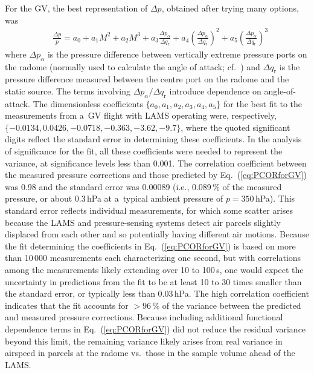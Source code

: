 \documentclass[amtd, online, hvmath]{copernicus}
\begin{document}
For the GV, the best representation of $\Delta p$, obtained after
trying many options, was
\begin{align}
    &\frac{\Delta p}{p}  = a_0+a_1M^2+a_2M^3
    +a_3\frac{\Delta p_{\alpha}}{\Delta
      q_{\mathrm{r}}}+a_4\left(\frac{\Delta p_{\alpha}}{\Delta
        q_{\mathrm{r}}}\right)^2+a_5\left(\frac{\Delta
        p_{\alpha}}{\Delta q_{\mathrm{r}}}\right)^3\label{eq:PCORforGV}
\end{align}
where $\Delta p_{\alpha}$ is the pressure difference between
vertically extreme pressure ports on the radome (normally used to
calculate the angle of attack; cf.~\citealp{BrownFrieheLenschow1983})
and $\Delta q_{\mathrm{r}}$ is the pressure difference measured
between the centre port on the radome and the static source. The terms
involving $\Delta p_{\alpha}/\Delta q_{\mathrm{r}}$ introduce
dependence on angle-of-attack. The dimensionless coefficients $\{a_0,
a_1, a_2, a_3, a_4, a_5\}$ for the best fit to the measurements from
a~GV flight with LAMS operating were, respectively, $\{-0.0134,
0.0426, -0.0718, -0.363, -3.62, -9.7\}$, where the quoted significant
digits reflect the standard error in determining these
coefficients. In the analysis of significance for the fit, all these
coefficients were needed to represent the variance, at significance
levels less than 0.001. The correlation coefficient between the
measured pressure corrections and those predicted by
Eq.~(\ref{eq:PCORforGV}) was 0.98 and the standard error was 0.00089
(i.e., 0.089\,{\%} of the measured pressure, or about 0.3\,hPa at
a~typical ambient pressure of $p=350$\,hPa). This standard error
reflects individual measurements, for which some scatter arises
because the LAMS and pressure-sensing systems detect air parcels
slightly displaced from each other and so potentially having different
air motions. Because the fit determining the coefficients in
Eq.~(\ref{eq:PCORforGV}) is based on more than 10\,000 measurements
each characterizing one second, but with correlations among the
measurements likely extending over 10 to 100\,s, one would expect the
uncertainty in predictions from the fit to be at least 10 to 30 times
smaller than the standard error, or typically less than 0.03\,hPa. The
high correlation coefficient indicates that the fit accounts for
$>96$\,{\%} of the variance between the predicted and measured
pressure corrections. Because including additional functional
dependence terms in Eq.~(\ref{eq:PCORforGV}) did not reduce the
residual variance beyond this limit, the remaining variance likely
arises from real variance in airspeed in parcels at the radome
vs.~those in the sample volume ahead of the LAMS.
\end{document}

